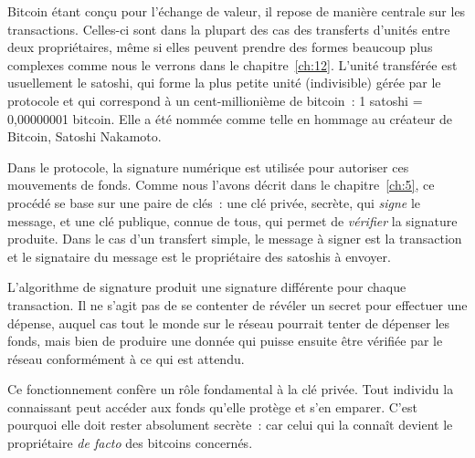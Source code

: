 Bitcoin étant conçu pour l'échange de valeur, il repose de manière centrale sur les transactions. Celles-ci sont dans la plupart des cas des transferts d'unités entre deux propriétaires, même si elles peuvent prendre des formes beaucoup plus complexes comme nous le verrons dans le chapitre~\ref{ch:12}. L'unité transférée est usuellement le satoshi, qui forme la plus petite unité (indivisible) gérée par le protocole et qui correspond à un cent-millionième de bitcoin~: 1 satoshi = 0,00000001 bitcoin. Elle a été nommée comme telle en hommage au créateur de Bitcoin, Satoshi Nakamoto.

Dans le protocole, la signature numérique est utilisée pour autoriser ces mouvements de fonds. Comme nous l'avons décrit dans le chapitre~\ref{ch:5}, ce procédé se base sur une paire de clés~: une clé privée, secrète, qui \emph{signe} le message, et une clé publique, connue de tous, qui permet de \emph{vérifier} la signature produite. Dans le cas d'un transfert simple, le message à signer est la transaction et le signataire du message est le propriétaire des satoshis à envoyer.

L'algorithme de signature produit une signature différente pour chaque  transaction. Il ne s'agit pas de se contenter de révéler un secret pour effectuer une dépense, auquel cas tout le monde sur le réseau pourrait tenter de dépenser les fonds, mais bien de produire une donnée qui puisse ensuite être vérifiée par le réseau conformément à ce qui est attendu.

Ce fonctionnement confère un rôle fondamental à la clé privée. Tout individu la connaissant peut accéder aux fonds qu'elle protège et s'en emparer. C'est pourquoi elle doit rester absolument secrète~: car celui qui la connaît devient le propriétaire \emph{de facto} des bitcoins concernés.


